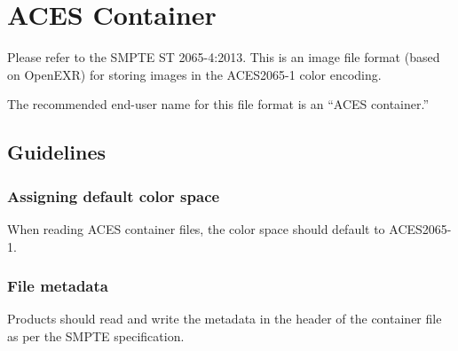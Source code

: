 \numberedformat
\chapter{ACES Container}

Please refer to the SMPTE ST 2065-4:2013.  This is an image file format (based on OpenEXR) for storing images in the ACES2065-1 color encoding.

The recommended end-user name for this file format is an ``ACES container.''

\section{Guidelines}
\subsection{Assigning default color space}
When reading ACES container files, the color space should default to ACES2065-1.

\subsection{File metadata}
Products should read and write the metadata in the header of the container file as per the SMPTE specification.